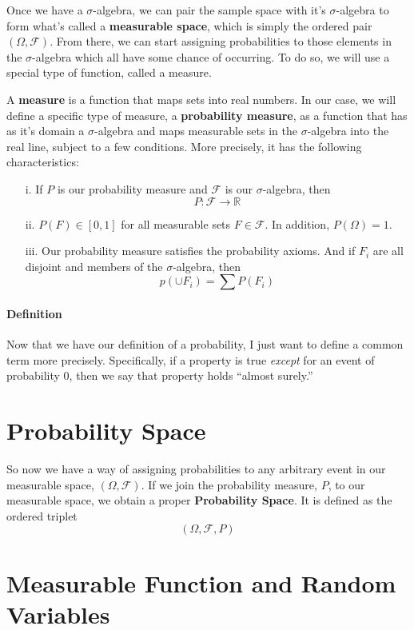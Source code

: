 \documentclass[a4paper,12pt]{scrartcl}
\begin{document}
Once we have a $\sigma$-algebra, we can pair the sample space with it's 
$\sigma$-algebra to form what's called a 
\textbf{measurable space}, which is simply the ordered pair 
$(\Omega, \mathcal{F})$.  From there, we can start assigning 
probabilities to those elements in the $\sigma$-algebra which all have 
some chance of occurring.  To do so, we will use a special
type of function, called a measure.

A \textbf{measure} is a function that maps sets into real numbers. 
In our case, we will define a specific type of measure, a 
\textbf{probability measure}, as a 
function that has as it's domain a $\sigma$-algebra and maps measurable 
sets in the $\sigma$-algebra into the 
real line, subject to a few conditions. More precisely, it has the 
following characteristics:
\begin{itemize}
   \item[i.] If $P$ is our probability measure and $\mathcal{F}$ is 
      our $\sigma$-algebra, then 
	 \[ P: \mathcal{F} \rightarrow \mathbb{R} \]
   \item[ii.] $ P(F) \in [0,1]$ for all measurable sets 
      $F \in \mathcal{F}$. In addition, $P(\Omega) =1$.
   \item[iii.] Our probability measure satisfies the probability axioms.
      And if $F_i$ are all disjoint and members of the $\sigma$-algebra, 
      then 
	 \[ p( \cup F_i) = \sum P(F_i) \]
\end{itemize}

\paragraph{Definition} Now that we have our definition of a probability,
I just want to define a common term more precisely.  Specifically,
if a property is true \emph{except} for an event of probability 0, 
then we say that property holds ``almost surely.''

\section{Probability Space}

So now we have a way of assigning probabilities to any arbitrary event in our measurable space, $(\Omega, \mathcal{F})$. If we
join the probability measure, $P$, to our measurable space, we obtain a proper \textbf{Probability Space}.  It is defined as 
the ordered triplet
\[(\Omega, \mathcal{F}, P) \]

\section{Measurable Function and Random Variables}
\end{document}
